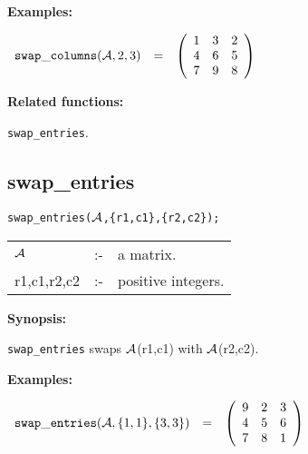 {\bf Examples:}

\begin{flushleft}
\hspace*{0.1in}
\begin{math}
\begin{array}{ccc}
{\tt swap\_columns}({\cal A},2,3) & = &
        \left( \begin{array}{ccc} 1 & 3 & 2 \\ 4 & 6 & 5 \\ 7 & 9 & 8
 \end{array} \right)
\end{array}
\end{math}
\end{flushleft}

{\bf Related functions:}

\hspace*{0.175in} {\tt swap\_entries}.


\subsection{swap\_entries}


\hspace*{0.175in} {\tt swap\_entries(${\cal A}$,\{r1,c1\},\{r2,c2\});}

\hspace*{0.1in}
\begin{tabular}{l l l}
${\cal A}$  &:-& a matrix. \\
r1,c1,r2,c2 &:-& positive integers.
\end{tabular}

{\bf Synopsis:} %

\hspace*{0.175in} {\tt swap\_entries} swaps ${\cal A}$(r1,c1) with
                ${\cal A}$(r2,c2).

{\bf Examples:}

\begin{flushleft}
\hspace*{0.1in}
\begin{math}
\begin{array}{ccc}
{\tt swap\_entries}({\cal A},\{1,1\},\{3,3\}) & = &
        \left( \begin{array}{ccc} 9 & 2 & 3 \\ 4 & 5 & 6 \\ 7 & 8 & 1
 \end{array} \right)
\end{array}
\end{math}
\end{flushleft}

